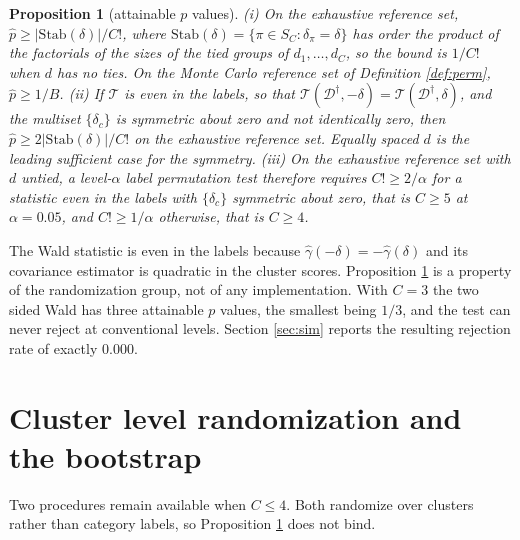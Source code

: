 \documentclass[12pt]{article}
\newtheorem{proposition}{Proposition}
\theoremstyle{definition}
\numberwithin{equation}{section}
\begin{document}
\begin{proposition}[attainable $p$ values]
\label{prop:resolution}
(i) On the exhaustive reference set, $\hat{p} \ge |\mathrm{Stab}(\delta)|/C!$,
where $\mathrm{Stab}(\delta) = \{\pi \in S_C : \delta_\pi = \delta\}$ has order
the product of the factorials of the sizes of the tied groups of
$d_1,\dots,d_C$, so the bound is $1/C!$ when $d$ has no ties. On the Monte Carlo
reference set of Definition \ref{def:perm}, $\hat{p} \ge 1/B$. (ii) If
$\mathcal{T}$ is even in the labels, so that
$\mathcal{T}(\mathcal{D}^{\dagger},-\delta) =
\mathcal{T}(\mathcal{D}^{\dagger},\delta)$, and the multiset $\{\delta_c\}$ is
symmetric about zero and not identically zero, then $\hat{p} \ge
2|\mathrm{Stab}(\delta)|/C!$ on the exhaustive reference set. Equally spaced $d$
is the leading sufficient case for the symmetry. (iii) On the exhaustive
reference set with $d$ untied, a level-$\alpha$ label permutation test therefore
requires $C! \ge 2/\alpha$ for a statistic even in the labels with
$\{\delta_c\}$ symmetric about zero, that is $C \ge 5$ at $\alpha = 0.05$, and
$C! \ge 1/\alpha$ otherwise, that is $C \ge 4$.
\end{proposition}

The Wald statistic is even in the labels because $\hat{\gamma}(-\delta) =
-\hat{\gamma}(\delta)$ and its covariance estimator is quadratic in the cluster
scores. Proposition \ref{prop:resolution} is a property of the randomization
group, not of any implementation. With $C = 3$ the two sided Wald has three
attainable $p$ values, the smallest being $1/3$, and the test can never reject
at conventional levels. Section \ref{sec:sim} reports the resulting rejection
rate of exactly $0.000$.

\section{Cluster level randomization and the bootstrap}
\label{sec:cluster}

Two procedures remain available when $C \le 4$. Both randomize over clusters
rather than category labels, so Proposition \ref{prop:resolution} does not bind.
\end{document}
